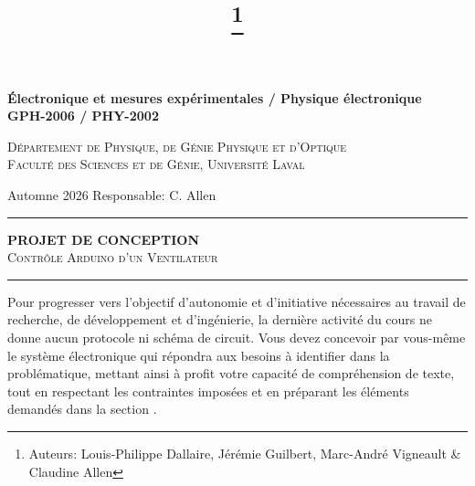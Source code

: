 \documentclass[english,french,12pt]{article}
\title{\vspace{-7em}\thanks{Auteurs: Louis-Philippe Dallaire, Jérémie Guilbert, Marc-André Vigneault \& Claudine Allen}}
\date{}
\begin{document}
\maketitle\thispagestyle{fancy}
%
%
\begin{center}
    \textbf{\large{Électronique et mesures expérimentales / Physique électronique}}\\
    \vspace{0.2em}
    \textbf{GPH-2006 / PHY-2002}

    \textsc{Département de Physique, de Génie Physique et d'Optique\\
    Faculté des Sciences et de Génie, Université Laval}
\end{center}

\vspace{-1em}
\noindent Automne 2026 \hfill Responsable: C. Allen\par
\vspace{0.2ex}
\hrule
\vspace{0.5ex}
\centering
    \textbf{PROJET DE CONCEPTION}\\
    \textsc{Contrôle Arduino d'un Ventilateur}\par
\vspace{2ex}
\hrule
\justify
\vspace{-1ex}
Pour progresser vers l'objectif d'autonomie et d'initiative nécessaires au travail de recherche, de développement et d'ingénierie, la dernière activité du cours ne donne aucun protocole ni schéma de circuit. Vous devez concevoir par vous-même le système électronique qui répondra aux besoins à identifier dans la problématique, mettant ainsi à profit votre capacité de compréhension de texte, tout en respectant les contraintes imposées et en préparant les éléments demandés dans la section . 

\end{document}
